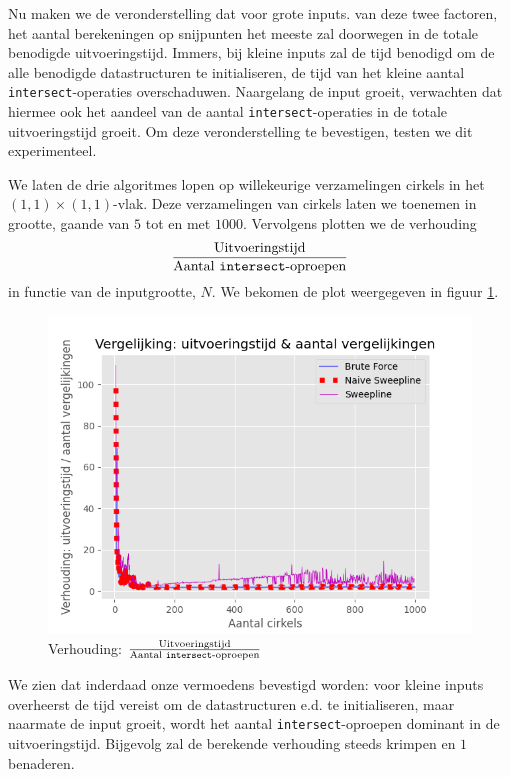 \documentclass[12pt]{article}
\begin{document}
Nu maken we de veronderstelling dat voor grote inputs. van deze twee factoren, het aantal berekeningen op snijpunten het meeste zal doorwegen in de totale benodigde uitvoeringstijd. Immers, bij kleine inputs zal de tijd benodigd om de alle benodigde datastructuren te initialiseren, de tijd van het kleine aantal \texttt{intersect}-operaties overschaduwen. Naargelang de input groeit, verwachten dat hiermee ook het aandeel van de aantal \texttt{intersect}-operaties in de totale uitvoeringstijd groeit. Om deze veronderstelling te bevestigen, testen we dit experimenteel.

We laten de drie algoritmes lopen op willekeurige verzamelingen cirkels in het $ (1,1) \times (1,1)$-vlak. Deze verzamelingen van cirkels laten we toenemen in grootte, gaande van $5$ tot en met $1000$. Vervolgens plotten we de verhouding $$\frac{\text{Uitvoeringstijd}}{\text{Aantal \texttt{intersect}-oproepen}}$$ in functie van de inputgrootte, $N$. We bekomen de plot weergegeven in figuur \ref{fig:verhouding}. 

\begin{figure}[H]
	\centering
	\includegraphics[width=\linewidth]{../plots/ExecutionTimesToCompares.png}
	\caption{Verhouding: $\frac{\text{Uitvoeringstijd}}{\text{Aantal \texttt{intersect}-oproepen}}$}
	\label{fig:verhouding}
\end{figure}

We zien dat inderdaad onze vermoedens bevestigd worden: voor kleine inputs overheerst de tijd vereist om de datastructuren e.d. te initialiseren, maar naarmate de input groeit, wordt het aantal \texttt{intersect}-oproepen dominant in de uitvoeringstijd. Bijgevolg zal de berekende verhouding steeds krimpen en $1$ benaderen.
\end{document}
